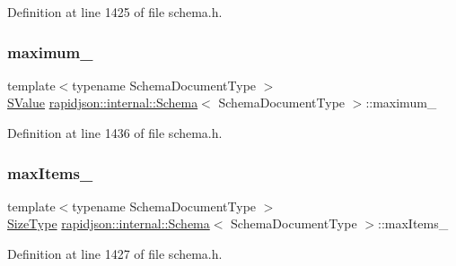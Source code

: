Definition at line 1425 of file schema.\+h.

\mbox{\label{classrapidjson_1_1internal_1_1_schema_a6cb5d8227b36b9c7b02ac57f3695884e}} 
\subsubsection{\texorpdfstring{maximum\_}{maximum\_}}
{\footnotesize\ttfamily template$<$typename Schema\+Document\+Type $>$ \\
\mbox{\hyperlink{classrapidjson_1_1internal_1_1_schema_a9f716b06fc542c4cdb7d8d5cf463bf79}{S\+Value}} \mbox{\hyperlink{classrapidjson_1_1internal_1_1_schema}{rapidjson\+::internal\+::\+Schema}}$<$ Schema\+Document\+Type $>$\+::maximum\+\_\+\hspace{0.3cm}{\ttfamily [private]}}



Definition at line 1436 of file schema.\+h.

\mbox{\label{classrapidjson_1_1internal_1_1_schema_aa73917ad23bab03bd917dbb2bf5d182f}} 
\subsubsection{\texorpdfstring{maxItems\_}{maxItems\_}}
{\footnotesize\ttfamily template$<$typename Schema\+Document\+Type $>$ \\
\mbox{\hyperlink{namespacerapidjson_a44eb33eaa523e36d466b1ced64b85c84}{Size\+Type}} \mbox{\hyperlink{classrapidjson_1_1internal_1_1_schema}{rapidjson\+::internal\+::\+Schema}}$<$ Schema\+Document\+Type $>$\+::max\+Items\+\_\+\hspace{0.3cm}{\ttfamily [private]}}



Definition at line 1427 of file schema.\+h.

